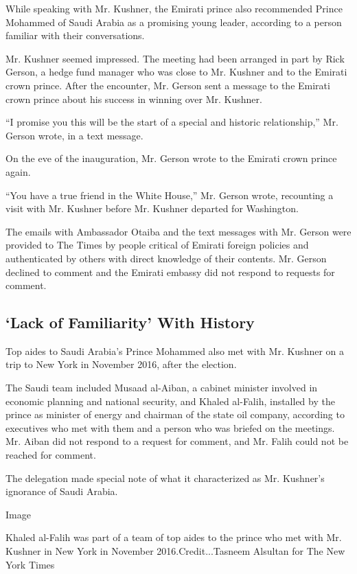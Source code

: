 While speaking with Mr. Kushner, the Emirati prince also recommended
Prince Mohammed of Saudi Arabia as a promising young leader, according
to a person familiar with their conversations.

Mr. Kushner seemed impressed. The meeting had been arranged in part by
Rick Gerson, a hedge fund manager who was close to Mr. Kushner and to
the Emirati crown prince. After the encounter, Mr. Gerson sent a message
to the Emirati crown prince about his success in winning over Mr.
Kushner.

``I promise you this will be the start of a special and historic
relationship,'' Mr. Gerson wrote, in a text message.

On the eve of the inauguration, Mr. Gerson wrote to the Emirati crown
prince again.

``You have a true friend in the White House,'' Mr. Gerson wrote,
recounting a visit with Mr. Kushner before Mr. Kushner departed for
Washington.

The emails with Ambassador Otaiba and the text messages with Mr. Gerson
were provided to The Times by people critical of Emirati foreign
policies and authenticated by others with direct knowledge of their
contents. Mr. Gerson declined to comment and the Emirati embassy did not
respond to requests for comment.

\hypertarget{lack-of-familiarity-with-history}{%
\subsection{`Lack of Familiarity' With
History}\label{lack-of-familiarity-with-history}}

Top aides to Saudi Arabia's Prince Mohammed also met with Mr. Kushner on
a trip to New York in November 2016, after the election.

The Saudi team included Musaad al-Aiban, a cabinet minister involved in
economic planning and national security, and Khaled al-Falih, installed
by the prince as minister of energy and chairman of the state oil
company, according to executives who met with them and a person who was
briefed on the meetings. Mr. Aiban did not respond to a request for
comment, and Mr. Falih could not be reached for comment.

The delegation made special note of what it characterized as Mr.
Kushner's ignorance of Saudi Arabia.

Image

Khaled al-Falih was part of a team of top aides to the prince who met
with Mr. Kushner in New York in November 2016.Credit...Tasneem Alsultan
for The New York Times


